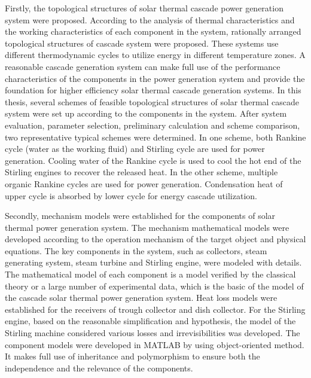 {Firstly, the topological structures of solar thermal cascade power generation system were proposed. According to the analysis of thermal characteristics and the working characteristics of each component in the system, rationally arranged topological structures of cascade system were proposed. These systems use different thermodynamic cycles to utilize energy in different temperature zones. A reasonable cascade generation system can make full use of the performance characteristics of the components in the power generation system and provide the foundation for higher efficiency solar thermal cascade generation systems. In this thesis, several schemes of feasible topological structures of solar thermal cascade system were set up according to the components in the system. After system evaluation, parameter selection, preliminary calculation and scheme comparison, two representative typical schemes were determined. In one scheme, both Rankine cycle (water as the working fluid) and Stirling cycle are used for power generation. Cooling water of the Rankine cycle is used to cool the hot end of the Stirling engines to recover the released heat. In the other scheme, multiple organic Rankine cycles are used for power generation. Condensation heat of upper cycle is absorbed by lower cycle for energy cascade utilization.


Secondly, mechanism models were established for the components of solar thermal power generation system. The mechanism mathematical models were developed according to the operation mechanism of the target object and physical equations. The key components in the system, such as collectors, steam generating system, steam turbine and Stirling engine, were modeled with details. The mathematical model of each component is a model verified by the classical theory or a large number of experimental data, which is the basic of the model of the cascade solar thermal power generation system. Heat loss models were established for the receivers of trough collector and dish collector. For the Stirling engine, based on the reasonable simplification and hypothesis, the model of the Stirling machine considered various losses and irrevisibilities was developed. The component models were developed in MATLAB by using object-oriented method. It makes full use of inheritance and polymorphism to ensure both the independence and the relevance of the components.

}

